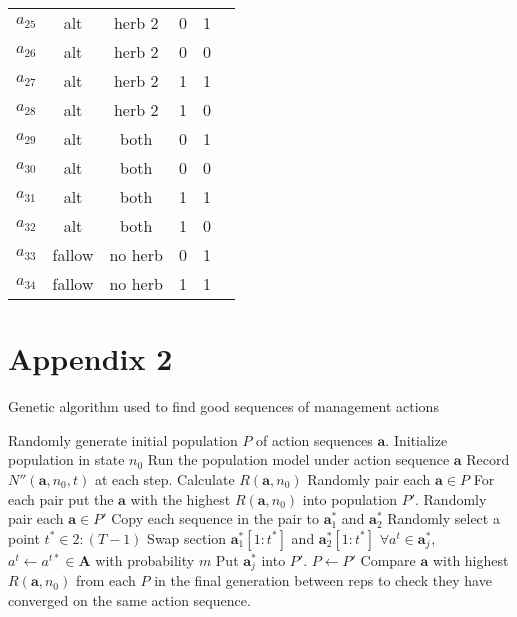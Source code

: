 \documentclass[12pt, a4paper]{article}
\begin{document}
\begin{longtable}[h]{c c c c c c}
	$a_{25}$ & alt & herb 2 & 0 & 1\\
	$a_{26}$ & alt & herb 2 & 0 & 0\\
	$a_{27}$ & alt & herb 2 & 1 & 1\\
	$a_{28}$ & alt & herb 2 & 1 & 0\\
	$a_{29}$ & alt & both & 0 & 1\\
	$a_{30}$ & alt & both & 0 & 0\\
	$a_{31}$ & alt & both & 1 & 1\\
	$a_{32}$ & alt & both & 1 & 0\\
	$a_{33}$ & fallow & no herb & 0 & 1\\
	$a_{34}$ & fallow & no herb & 1 & 1\\
	\hline
\end{longtable}

\section*{Appendix 2}
{
\begin{algorithm}[H]
\caption{Genetic algorithm used to find good sequences of management actions}
\label{alg:HDP}
\begin{algorithmic}[1]
		\State Randomly generate initial population $P$ of action sequences $\textbf{a}$.
				\State Initialize population in state $n_0$
					\State Run the population model under action sequence $\textbf{a}$ 
					\State Record $N''(\mathbf{a}, n_0, t)$ at each step.
				\EndFor
				\State Calculate $R(\mathbf{a}, n_0)$
			\EndFor
			\State Randomly pair each $\textbf{a} \in P$
			\State For each pair put the $\textbf{a}$ with the highest $R(\mathbf{a}, n_0)$ into population  $P'$.
			\State Randomly pair each $\textbf{a} \in P'$
				\State Copy each sequence in the pair to $\textbf{a}_1^*$ and $\textbf{a}_2^*$ 
				\State Randomly select a point $t^* \in 2:(T - 1)$
				\State Swap section $\textbf{a}_1^*[1:t^*]$ and $\textbf{a}_2^*[1:t^*]$
				\State $\forall a^t \in \textbf{a}_j^*$, $a^t \gets a^{t*} \in \textbf{A}$ with probability $m$  
				\State Put $\textbf{a}_j^*$ into $P'$.   
			\EndFor
			\State $P \gets P'$    
		\EndFor	 
	\EndFor
	\State Compare $\textbf{a}$ with highest $R(\mathbf{a}, n_0)$ from each $P$ in the final generation between reps to check they have converged on the same action sequence.   
\end{algorithmic}
\end{algorithm}  
}
\end{document}
